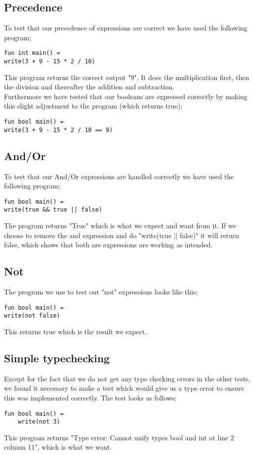 \documentclass[12pt]{article}
\begin{document}
\begin{center}
\begin{center}
\subsection{Precedence}
To test that our precedence of expressions are correct we have used the following program;
\begin{verbatim}
fun int main() =
write(3 + 9 - 15 * 2 / 10)
\end{verbatim}
This program returns the correct output "9". It does the multiplication first, then the division and thereafter the addition and subtraction.\\
Furthermore we have tested that our booleans are expressed correctly by making this slight adjustment to the program (which returns true);
\begin{verbatim}
fun bool main() =
write(3 + 9 - 15 * 2 / 10 == 9)
\end{verbatim}
\subsection{And/Or}
To test that our And/Or expressions are handled correctly we have used the following program;
\begin{verbatim}
fun bool main() =
write(true && true || false)
\end{verbatim}
The program returns "True" which is what we expect and want from it. If we choose to remove the and expression and do "write(true || false)" it will return false, which shows that both are expressions are working as intended.
\subsection{Not}
The program we use to test out "not" expressions looks like this;
\begin{verbatim}
fun bool main() =
write(not false)
\end{verbatim}
This returns true which is the result we expect.
\subsection{Simple typechecking}
Except for the fact that we do not get any type checking errors in the other tests, we found it necessary to make a test which would give us a type error to ensure this was implemented correctly. The test looks as follows;
\begin{verbatim}
fun bool main() =
    write(not 3)
\end{verbatim}
This program returns "Type error: Cannot unify types bool and int at line 2 column 11", which is what we want.

\end{center}
\end{center}
\end{document}
